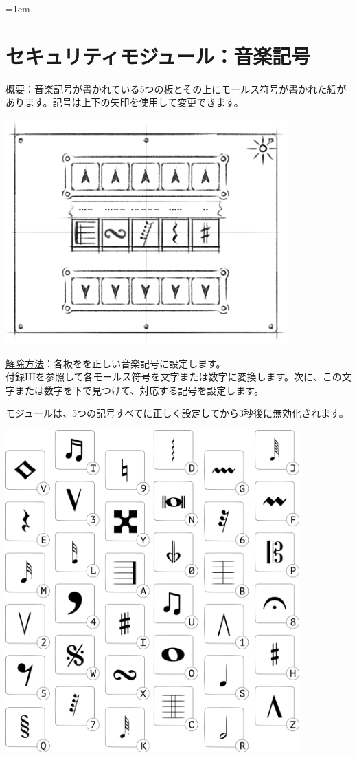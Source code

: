 \begin{minipage}{0.63\textwidth}
    \parskip=1em
    \section*{セキュリティモジュール：音楽記号}
    
    \uline{概要}：音楽記号が書かれている5つの板とその上にモールス符号が書かれた紙があります。記号は上下の矢印を使用して変更できます。
\end{minipage}%
\hfill%
\begin{minipage}{0.33\textwidth}
    \includegraphics[width=\textwidth]{images/54.png}
    \vspace*{\fill}
\end{minipage}
    
\uline{解除方法}：各板をを正しい音楽記号に設定します。\\付録IIIを参照して各モールス符号を文字または数字に変換します。次に{、}この文字または数字を下で見つけて{、}対応する記号を設定します。

モジュールは{、}5つの記号すべてに正しく設定してから3秒後に無効化されます。

\begin{center}
    \includegraphics[width=0.85\textwidth]{images/52.png}
\end{center}
